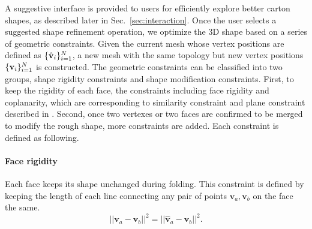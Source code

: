 
A suggestive interface is provided to users for efficiently explore better carton shapes, as described later in Sec.~\ref{sec:interaction}. 
%
Once the user selects a suggested shape refinement operation, we optimize the 3D shape based on a series of geometric constraints.
Given the current mesh whose vertex positions are defined as $\{\hat{\mathbf{v}}_i\}^{N}_{i=1}$, a new mesh with the same topology but new vertex positions $\{\mathbf{v}_i\}^{N}_{i=1}$ is constructed.
%
The geometric constraints can be classified into two groups, shape rigidity constraints and shape modification constraints.
% 
First, to keep the rigidity of each face, the constraints including face rigidity and coplanarity, which are corresponding to similarity constraint and plane constraint described in \cite{Bouaziz:2012:SSD:2346796.2346802}. 
%
Second, once two vertexes or two faces are confirmed to be merged to modify the rough shape, more constraints are added. 
%
Each constraint is defined as following.  



\paragraph{Face rigidity} 
Each face keeps its shape unchanged during folding. This constraint is defined by keeping the length of each line connecting any pair of points $\mathbf{v}_{a}, \mathbf{v}_{b}$ on the face the same.
\begin{equation}
||\mathbf{v}_{a} - \mathbf{v}_{b}||^2 = ||\hat{\mathbf{v}}_{a} - \hat{\mathbf{v}}_{b}||^2.
\label{equ:plane}
\end{equation}





